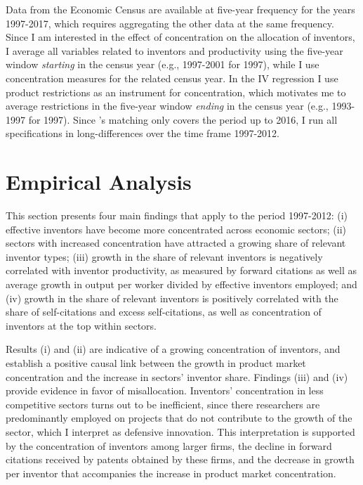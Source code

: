 Data from the Economic Census are available at five-year frequency
for the years 1997-2017, which requires aggregating the other data
at the same frequency. Since I am interested in the effect of concentration
on the allocation of inventors, I average all variables related to
inventors and productivity using the five-year window \emph{starting
}in the census year (e.g., 1997-2001 for 1997), while I use concentration
measures for the related census year. In the IV regression I use product
restrictions as an instrument for concentration, which motivates me
to average restrictions in the five-year window \emph{ending} in the
census year (e.g., 1993-1997 for 1997). Since \citet{goldschlagAlgorithmicLinksProbabilities2016}'s
matching only covers the period up to 2016, I run all specifications
in long-differences over the time frame 1997-2012. 

\section{Empirical Analysis\label{sec:Results}}

This section presents four main findings that apply to the period
1997-2012: (i) effective inventors have become more concentrated across
economic sectors; (ii) sectors with increased concentration have attracted
a growing share of relevant inventor types; (iii) growth in the share
of relevant inventors is negatively correlated with inventor productivity,
as measured by forward citations as well as average growth in output
per worker divided by effective inventors employed; and (iv) growth
in the share of relevant inventors is positively correlated with the
share of self-citations and excess self-citations, as well as concentration
of inventors at the top within sectors. 

Results (i) and (ii) are indicative of a growing concentration of
inventors, and establish a positive causal link between the growth
in product market concentration and the increase in sectors' inventor
share. Findings (iii) and (iv) provide evidence in favor of misallocation.
Inventors' concentration in less competitive sectors turns out to
be inefficient, since there researchers are predominantly employed
on projects that do not contribute to the growth of the sector, which
I interpret as defensive innovation. This interpretation is supported
by the concentration of inventors among larger firms, the decline
in forward citations received by patents obtained by these firms,
and the decrease in growth per inventor that accompanies the increase
in product market concentration.

